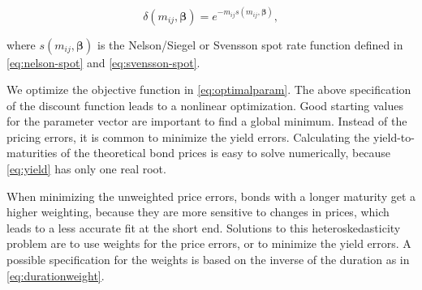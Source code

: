 \begin{displaymath}
\delta(m_{ij}, \bm{\beta})=e^{-m_{ij}s(m_{ij},\bm{\beta})},
\end{displaymath}

where $s(m_{ij},\bm{\beta})$ is the Nelson/Siegel or Svensson spot rate function defined in \eqref{eq:nelson-spot} and \eqref{eq:svensson-spot}.

We optimize the objective function in \eqref{eq:optimalparam}. The above specification of the discount function leads to a nonlinear optimization. Good starting values for the parameter vector are important to find a global minimum. Instead of the pricing errors, it is common to minimize the yield errors. Calculating the yield-to-maturities of the theoretical bond prices is easy to solve numerically, because \eqref{eq:yield} has only one real root. 

When minimizing the unweighted price errors, bonds with a longer maturity get a higher weighting, because they are more sensitive to changes in prices, which leads to a less accurate fit at the short end. Solutions to this heteroskedasticity problem are to use weights for the price errors, or to minimize the yield errors. A possible specification for the weights is based on the inverse of the duration as in \eqref{eq:durationweight}.


